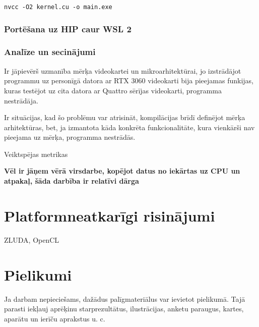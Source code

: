 \documentclass[12pt]{report}%
\theoremstyle{definition}
\begin{document}
\texttt{nvcc -O2 kernel.cu -o main.exe}

\subsection{Portēšana uz HIP caur WSL 2}

\subsection{Analīze un secinājumi}

Ir jāpievērš uzmanība mērķa videokartei un mikroarhitektūrai, jo izstrādājot programmu uz personīgā datora 
ar RTX 3060 videokarti bija pieejamas funkijas, kuras testējot uz cita datora ar Quattro sērījas videokarti,
programma nestrādāja.

Ir situācijas, kad šo problēmu var atrisināt, kompilācijas brīdī definējot mērķa arhitektūras, bet,
ja izmantota kāda konkrēta funkcionalitāte, kura vienkārši nav pieejama uz mērķa, programma nestrādās.


Veiktspējas metrikas

\textbf{Vēl ir jāņem vērā virsdarbe, kopējot datus no iekārtas uz CPU un atpakaļ, šāda darbība ir relatīvi dārga}

\chapter{Platformneatkarīgi risinājumi}
ZLUDA, OpenCL


\cleardoublepage
{}
{}
\printbibliography

\newpage
\chapter*{Pielikumi}


Ja darbam nepieciešams, dažādus palīgmateriālus var ievietot pielikumā. Tajā
parasti iekļauj aprēķinu starprezultātus, ilustrācijas, anketu paraugus, kartes, aparātu un ierīču aprakstus u. c.
\end{document}

